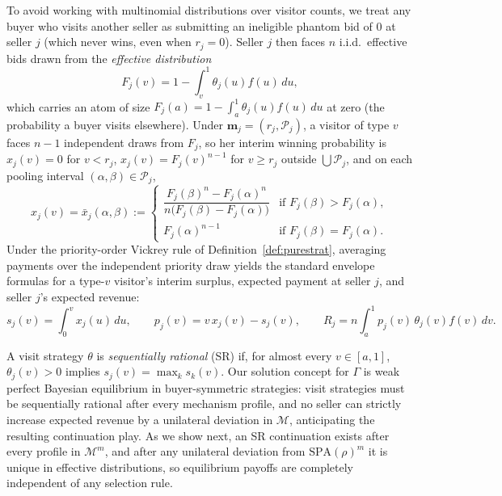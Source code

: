 \documentclass[12pt]{article}
\theoremstyle{mystyle}
\theoremstyle{mystyle2}
\newcommand{\M}{\mathcal{M}}
\newcommand{\cP}{\mathcal{P}}
\newcommand{\bmm}{\mathbf{m}}
\newcommand{\SPA}{\mathrm{SPA}}
\newcommand{\1}{\mathbf{1}}
\begin{document}
To avoid working with multinomial distributions over visitor counts, we treat any buyer who visits another seller as submitting an ineligible phantom bid of $0$ at seller $j$ (which never wins, even when $r_j=0$). Seller $j$ then faces $n$ i.i.d.\ effective bids drawn from the \emph{effective distribution}
\[
F_j(v) = 1 - \int_v^1 \theta_j(u)f(u)\,du,
\]
which carries an atom of size $F_j(a)=1-\int_a^1\theta_j(u)f(u)\,du$ at zero (the probability a buyer visits elsewhere). Under $\bmm_j=(r_j,\cP_j)$, a visitor of type $v$ faces $n-1$ independent draws from $F_j$, so her interim winning probability is $x_j(v)=0$ for $v<r_j$, $x_j(v)=F_j(v)^{n-1}$ for $v\ge r_j$ outside $\bigcup\cP_j$, and on each pooling interval $(\alpha,\beta)\in\cP_j$,
\begin{equation}\label{eq:poolalloc}
x_j(v) = \bar x_j(\alpha,\beta) := \begin{cases}
\dfrac{F_j(\beta)^n - F_j(\alpha)^n}{n\bigl(F_j(\beta)-F_j(\alpha)\bigr)} & \text{if } F_j(\beta)>F_j(\alpha),\\[6pt]
F_j(\alpha)^{n-1} & \text{if } F_j(\beta)=F_j(\alpha).
\end{cases}
\end{equation}
Under the priority-order Vickrey rule of Definition~\ref{def:purestrat}, averaging payments over the independent priority draw yields the standard envelope formulas for a type-$v$ visitor's interim surplus, expected payment at seller $j$, and seller $j$'s expected revenue:
\begin{equation}\label{eq:payoffs}
s_j(v) = \int_0^v x_j(u)\,du, \qquad p_j(v) = v\,x_j(v) - s_j(v), \qquad R_j = n\int_a^1 p_j(v)\,\theta_j(v)f(v)\,dv.
\end{equation}

A visit strategy $\theta$ is \emph{sequentially rational} (SR) if, for almost every $v\in[a,1]$, $\theta_j(v)>0$ implies $s_j(v)=\max_k s_k(v)$. Our solution concept for $\Gamma$ is weak perfect Bayesian equilibrium in buyer-symmetric strategies: visit strategies must be sequentially rational after every mechanism profile, and no seller can strictly increase expected revenue by a unilateral deviation in $\M$, anticipating the resulting continuation play. As we show next, an SR continuation exists after every profile in $\M^m$, and after any unilateral deviation from $\SPA(\rho)^m$ it is unique in effective distributions, so equilibrium payoffs are completely independent of any selection rule.

\end{document}
